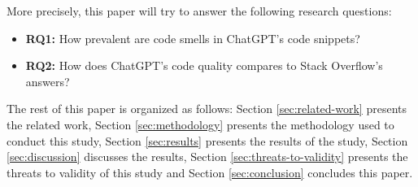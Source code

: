 More precisely, this paper will try to answer the following research questions:

\begin{itemize}
  \item \textbf{RQ1:} How prevalent are code smells in ChatGPT's code snippets?

  \item \textbf{RQ2:} How does ChatGPT's code quality compares to Stack Overflow's answers?

\end{itemize}

The rest of this paper is organized as follows: Section \ref{sec:related-work} presents the related work, Section \ref{sec:methodology} presents the methodology used to conduct this study, Section \ref{sec:results} presents the results of the study, Section \ref{sec:discussion} discusses the results, Section \ref{sec:threats-to-validity} presents the threats to validity of this study and Section \ref{sec:conclusion} concludes this paper.

